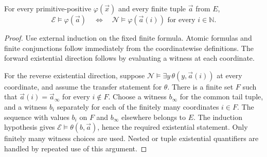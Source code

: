 \begin{lemma}
\label{lem:pp-transfer}
For every primitive-positive $\varphi(\vec x)$ and every finite tuple
$\vec a$ from $E$,
\[
 \mathcal E\models\varphi(\vec a)
 \quad\Longleftrightarrow\quad
 \mathcal N\models\varphi(\vec a(i))
                 \text{ for every }i\in\mathbb N.
 \tag{PP}\label{eq:pp-transfer}
\]
\end{lemma}
\begin{proof}
Use external induction on the fixed finite formula.  Atomic formulas
and finite conjunctions follow immediately from the coordinatewise
definitions.  The forward existential direction follows by evaluating
a witness at each coordinate.

For the reverse existential direction, suppose
$\mathcal N\models\exists y\,\theta(y,\vec a(i))$ at every
coordinate, and assume the transfer statement for $\theta$.  There is
a finite set $F$ such that $\vec a(i)=\vec a_\infty$ for every
$i\notin F$.  Choose a witness $b_\infty$ for the common tail tuple,
and a witness $b_i$ separately for each of the finitely many coordinates
$i\in F$.  The sequence with values $b_i$ on $F$ and $b_\infty$
elsewhere belongs to $E$.  The induction hypothesis gives
$\mathcal E\models\theta(b,\vec a)$, hence the required
existential statement.  Only finitely many witness choices are used.
Nested or tuple existential quantifiers are handled by repeated use of
this argument.
\end{proof}

